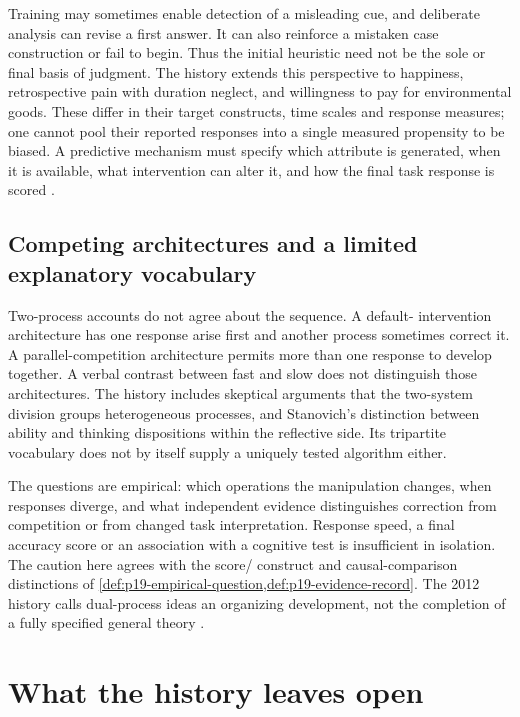 Training may sometimes enable detection of a misleading cue, and deliberate
analysis can revise a first answer. It can also reinforce a mistaken case
construction or fail to begin. Thus the initial heuristic need not be
the sole or final basis of judgment. The history extends this perspective
to happiness, retrospective pain with duration neglect, and willingness
to pay for environmental goods. These differ in their target constructs,
time scales and response measures; one cannot pool their reported
responses into a single measured propensity to be biased. A predictive
mechanism must specify which attribute is generated, when it is available,
what intervention can alter it, and how the final task response is scored
\cite[pp.~340--341]{GriffinEtAl2012HeuristicsHistory}.

\subsection{Competing architectures and a limited explanatory vocabulary}

Two-process accounts do not agree about the sequence. A default-
intervention architecture has one response arise first and another process
sometimes correct it. A parallel-competition architecture permits more
than one response to develop together. A verbal contrast between fast
and slow does not distinguish those architectures. The history includes
skeptical arguments that the two-system division groups heterogeneous
processes, and Stanovich's distinction between ability and thinking
dispositions within the reflective side. Its tripartite vocabulary
does not by itself supply a uniquely tested algorithm either.

The questions are empirical: which operations the manipulation changes,
when responses diverge, and what independent evidence distinguishes
correction from competition or from changed task interpretation. Response
speed, a final accuracy score or an association with a cognitive test
is insufficient in isolation. The caution here agrees with the score/
construct and causal-comparison distinctions of
\cref{def:p19-empirical-question,def:p19-evidence-record}.
The 2012 history calls dual-process ideas an organizing development,
not the completion of a fully specified general theory
\cite[p.~341]{GriffinEtAl2012HeuristicsHistory}.

\section{What the history leaves open}
\label{sec:p19-hph-open-questions}

